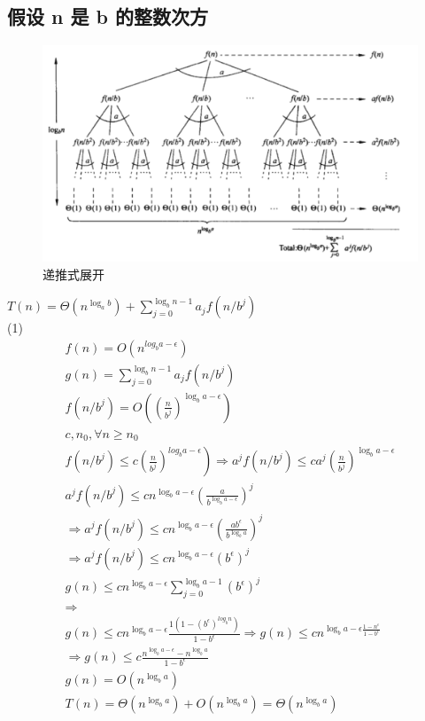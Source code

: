 \subsection{假设 n 是 b 的整数次方}
\begin{figure}[htb]
	\centering
	\includegraphics[scale=0.5]{image/mainmaster.png}
  \caption{递推式展开}\label{fig:nearestpoints-divide}
\end{figure}
 $T(n)=\Theta\left(n^{\log _{a} b}\right)+\sum_{j=0}^{\log _{b} n-1} a_{j} f\left(n / b^{j}\right)$\\
 (1)
 $$
 \begin{array}{l}
f(n)=O\left(n^{l o g_{b} a-\epsilon}\right) \\
g(n)=\sum_{j=0}^{\log _{b} n-1} a_{j} f\left(n / b^{j}\right) \\
f\left(n / b^{j}\right)=O\left(\left(\frac{n}{b^{j}}\right)^{\log _{b} a-\epsilon}\right) \\
c, n_{0}, \forall n \geq n_{0} \\
\left.f\left(n / b^{j}\right) \leq c\left(\frac{n}{b^{j}}\right)^{l o g_{b} a-\epsilon}\right) \Rightarrow a^{j} f\left(n / b^{j}\right) \leq c a^{j}\left(\frac{n}{b^{j}}\right)^{\log _{b} a-\epsilon} \\
a^{j} f\left(n / b^{j}\right) \leq c n^{\log _{b} a-\epsilon}\left(\frac{a}{b^{\log _{b} a-\epsilon}}\right)^{j} \\
\Rightarrow a^{j} f\left(n / b^{j}\right) \leq c n^{\log _{b} a-\epsilon}\left(\frac{a b^{\epsilon}}{b^{\log _{b} a}}\right)^{j} \\
\Rightarrow a^{j} f\left(n / b^{j}\right) \leq c n^{\log _{b} a-\epsilon}\left(b^{\epsilon}\right)^{j} \\
g(n) \leq c n^{\log _{b} a-\epsilon} \sum_{j=0}^{\log _{b} a-1}\left(b^{\epsilon}\right)^{j} \\
\Rightarrow \\g(n) \leq c n^{\log _{b} a-\epsilon} \frac{1\left(1-\left(b^{\epsilon}\right)^{l o g_{b} n}\right)}{1-b^{\epsilon}}
\Rightarrow g(n) \leq c n^{\log _{b} a-\epsilon \frac{1-n^{\epsilon}}{1-b^{\epsilon}}} \\
\Rightarrow g(n) \leq c \frac{n^{\log _{b} a-\epsilon}-n^{\log _{b} a}}{1-b^{\epsilon}} \\
g(n)=O\left(n^{\log _{b} a}\right) \\
T(n)=\Theta\left(n^{\log _{b} a}\right)+O\left(n^{\log _{b} a}\right)=\Theta\left(n^{\log _{b} a}\right)
\end{array}
 $$
